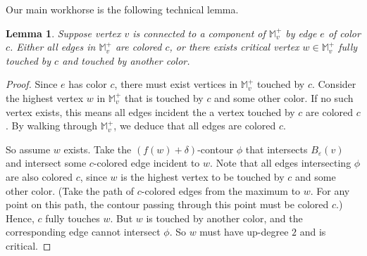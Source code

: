 \documentclass[11pt]{article}
\newcommand{\ignore}[1]{}
\newtheorem{lemma}[theorem]{Lemma}
\newtheorem{claim}[theorem]{Claim}
\theoremstyle{definition}
\newcommand{\cC}{{\cal C}}
\newcommand{\cJ}{{\cal J}}
\newcommand{\MM}{\mathbb{M}}
\newcommand{\eps}{\varepsilon}
\newcommand{\Thm}[1]{\hyperref[thm:#1]{Theorem~\ref*{thm:#1}}} %
\newcommand{\fcol}{full}
\newcommand{\h}{att}
\newcommand{\pal}{P}
\begin{document}
\ignore{
\begin{claim} \label{clm:process} Assume the invariant. Any vertex with a non-increasing path to some $\h(c)$
for $c \in \pal$ has been processed.
\end{claim}

\begin{proof} This is a direct consequence of \Thm{carr-mono}, which relates monotone paths in $\MM$ to $\cC(\MM)$.
Since the subtree of $\cJ(\MM)$ (which is basically the subtree of $\cC(\MM)$) rooted at $\h(c)$ 
has been found, all vertices in this subtree must be processed. These are all the vertices with non-increasing paths
to $\h(c)$ in $\cC(\MM)$, which by \Thm{carr-mono} is the same as those in $\cC(\MM)$.
\end{proof}
}

Our main workhorse is the following technical lemma. 

\begin{lemma} \label{lem:full} Suppose vertex $v$ is connected to a component of $\MM^+_v$
by edge $e$ of color $c$. Either all edges in $\MM^+_v$ are colored $c$, or there
exists critical vertex $w \in \MM^+_v$ fully touched by $c$ and touched by another color.
%
\end{lemma}

\begin{proof} Since $e$ has color $c$,
there must exist vertices in $\MM^+_v$ touched by $c$. Consider the highest
vertex $w$ in $\MM^+_v$ that is touched by $c$ and some other color. If no such vertex exists,
this means all edges incident the a vertex touched by $c$ are colored $c$. By walking through
$\MM^+_v$, we deduce that all edges are colored $c$. 

So assume $w$ exists. Take the $(f(w)+\delta)$-contour $\phi$ that intersects $B_\eps(v)$
and intersect some $c$-colored edge incident to $w$. Note that all edges intersecting $\phi$ are also colored $c$,
since $w$ is the highest vertex to be touched by $c$ and some other color. (Take the path of $c$-colored
edges from the maximum to $w$. For any point on this path, the contour passing through this point must
be colored $c$.) Hence, $c$ fully touches $w$. 
But $w$ is touched by another color, and the corresponding edge cannot intersect $\phi$. So $w$
must have up-degree $2$ and is critical.
\end{proof}
\end{document}
